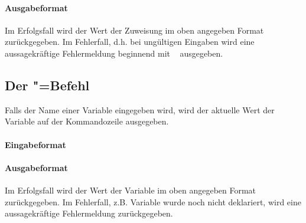 \documentclass{sdqassignment}
\begin{document}
\paragraph*{Ausgabeformat} 

\noindent Im Erfolgsfall wird der Wert der Zuweisung im oben angegeben Format zurückgegeben. Im Fehlerfall, d.h. bei ungültigen Eingaben wird eine aussagekräftige Fehlermeldung beginnend mit \textvisiblespace~ ausgegeben.

%
\subsection{Der "=Befehl}
Falls der Name einer Variable eingegeben wird, wird der aktuelle Wert der Variable auf der Kommandozeile ausgegeben.
\paragraph*{Eingabeformat} 
\paragraph*{Ausgabeformat} 

\noindent Im Erfolgsfall wird der Wert der Variable im oben angegeben Format zurückgegeben. Im Fehlerfall, z.B. Variable wurde noch nicht deklariert, wird eine aussagekräftige Fehlermeldung zurückgegeben.
\end{document}

